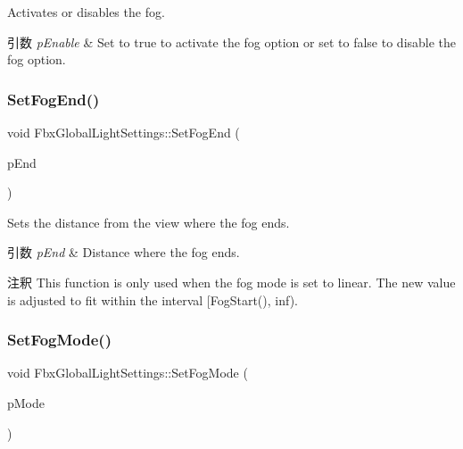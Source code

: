 Activates or disables the fog. 
\begin{DoxyParams}{引数}
{\em p\+Enable} & Set to {\ttfamily true} to activate the fog option or set to {\ttfamily false} to disable the fog option. \\
\hline
\end{DoxyParams}
\mbox{\label{class_fbx_global_light_settings_a3408c6c5b1cf643ebe81cd4daaac82dc}} 
\subsubsection{\texorpdfstring{Set\+Fog\+End()}{SetFogEnd()}}
{\footnotesize\ttfamily void Fbx\+Global\+Light\+Settings\+::\+Set\+Fog\+End (\begin{DoxyParamCaption}\item[{double}]{p\+End }\end{DoxyParamCaption})}

Sets the distance from the view where the fog ends. 
\begin{DoxyParams}{引数}
{\em p\+End} & Distance where the fog ends. \\
\hline
\end{DoxyParams}
\begin{DoxyRemark}{注釈}
This function is only used when the fog mode is set to linear. The new value is adjusted to fit within the interval \mbox{[}Fog\+Start(), inf). 
\end{DoxyRemark}
\mbox{\label{class_fbx_global_light_settings_a61010aa498fa159fa6fa91cf77d78501}} 
\subsubsection{\texorpdfstring{Set\+Fog\+Mode()}{SetFogMode()}}
{\footnotesize\ttfamily void Fbx\+Global\+Light\+Settings\+::\+Set\+Fog\+Mode (\begin{DoxyParamCaption}\item[{\hyperlink{class_fbx_global_light_settings_a2d6040cb267cbdb092bdf9fb73de8d6d}{E\+Fog\+Mode}}]{p\+Mode }\end{DoxyParamCaption})}

